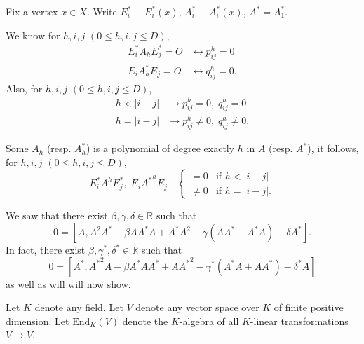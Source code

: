 \documentclass[
]{book}
\theoremstyle{definition}
\theoremstyle{definition}
\theoremstyle{definition}
\theoremstyle{definition}
\theoremstyle{remark}
\begin{document}
Fix a vertex \(x\in X\). Write \(E^*_i \equiv E^*_i(x)\), \(A^*_i \equiv A^*_i(x)\), \(A^* = A^*_1\).

We know for \(h, i, j\) \((0\leq h, i, j\leq D)\),
\begin{align}
E^*_iA_hE^*_j = O & \leftrightarrow p^h_{ij} = 0\\
E_iA_h^*E_j = O & \leftrightarrow q^h_{ij} = 0.
\end{align}
Also, for \(h, i, j\) \((0\leq h, i, j\leq D)\),
\begin{align}
h < |i-j| & \rightarrow p^h_{ij} = 0, \; q^h_{ij} = 0\\
h = |i-j| & \rightarrow p^h_{ij} \neq 0, \; q^h_{ij} \neq 0.
\end{align}

Some \(A_h\) (resp. \(A^*_h\)) is a polynomial of degree exactly \(h\) in \(A\) (resp. \(A^*\)), it follows, for \(h, i, j\) \((0\leq h, i, j\leq D)\),
\[E^*_iA^hE^*_j, \; E_i{A^*}^hE_j \quad \begin{cases} = 0 & \text{if } h < |i-j|\\
\neq 0 & \text{if } h = |i-j|.\end{cases}\]

We saw that there exist \(\beta, \gamma, \delta\in \mathbb{R}\) such that
\[0 = [A, A^2A^*-\beta AA^*A + A^*A^2 - \gamma(AA^*+A^*A) - \delta A^*].\]
In fact, there exist \(\beta, \gamma^*, \delta^*\in \mathbb{R}\) such that
\[0 = [A^*, {A^*}^2A-\beta A^*AA^* + A{A^*}^2 - \gamma^*(A^*A+AA^*) - \delta^* A]\]
as well as will will now show.

Let \(K\) denote any field. Let \(V\) denote any vector space over \(K\) of finite positive dimension. Let \(\mathrm{End}_K(V)\) denote the \(K\)-algebra of all \(K\)-linear transformations \(V\to V\).
\end{document}
